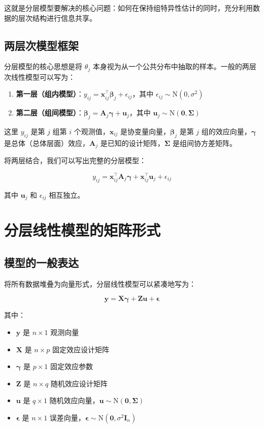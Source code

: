 这就是分层模型要解决的核心问题：如何在保持组特异性估计的同时，充分利用数据的层次结构进行信息共享。

\subsection{两层次模型框架}
\label{sec:two-level-framework}

分层模型的核心思想是将 $\theta_j$ 本身视为从一个公共分布中抽取的样本。一般的两层次线性模型可以写为：

\begin{enumerate}
  \item \textbf{第一层（组内模型）}：$y_{ij} = \mathbf{x}_{ij}^\top \boldsymbol{\beta}_j + \epsilon_{ij}$，其中 $\epsilon_{ij} \sim \mathrm{N}(0, \sigma^2)$
  \item \textbf{第二层（组间模型）}：$\boldsymbol{\beta}_j = \mathbf{A}_j \boldsymbol{\gamma} + \mathbf{u}_j$，其中 $\mathbf{u}_j \sim \mathrm{N}(\mathbf{0}, \boldsymbol{\Sigma})$
\end{enumerate}

这里 $y_{ij}$ 是第 $j$ 组第 $i$ 个观测值，$\mathbf{x}_{ij}$ 是协变量向量，$\boldsymbol{\beta}_j$ 是第 $j$ 组的效应向量，$\boldsymbol{\gamma}$ 是总体（总体层面）效应，$\mathbf{A}_j$ 是已知的设计矩阵，$\boldsymbol{\Sigma}$ 是组间协方差矩阵。

将两层结合，我们可以写出完整的分层模型：

\[
y_{ij} = \mathbf{x}_{ij}^\top \mathbf{A}_j \boldsymbol{\gamma} + \mathbf{x}_{ij}^\top \mathbf{u}_j + \epsilon_{ij}
\]

其中 $\mathbf{u}_j$ 和 $\epsilon_{ij}$ 相互独立。

\section{分层线性模型的矩阵形式}
\label{sec:matrix-formulation}

\subsection{模型的一般表达}
\label{sec:general-matrix-form}

将所有数据堆叠为向量形式，分层线性模型可以紧凑地写为：

\[
\mathbf{y} = \mathbf{X}\boldsymbol{\gamma} + \mathbf{Z}\mathbf{u} + \boldsymbol{\epsilon}
\]

其中：
\begin{itemize}
  \item $\mathbf{y}$ 是 $n \times 1$ 观测向量
  \item $\mathbf{X}$ 是 $n \times p$ 固定效应设计矩阵
  \item $\boldsymbol{\gamma}$ 是 $p \times 1$ 固定效应参数
  \item $\mathbf{Z}$ 是 $n \times q$ 随机效应设计矩阵
  \item $\mathbf{u}$ 是 $q \times 1$ 随机效应向量，$\mathbf{u} \sim \mathrm{N}(\mathbf{0}, \boldsymbol{\Sigma})$
  \item $\boldsymbol{\epsilon}$ 是 $n \times 1$ 误差向量，$\boldsymbol{\epsilon} \sim \mathrm{N}(\mathbf{0}, \sigma^2 \mathbf{I}_n)$
\end{itemize}

